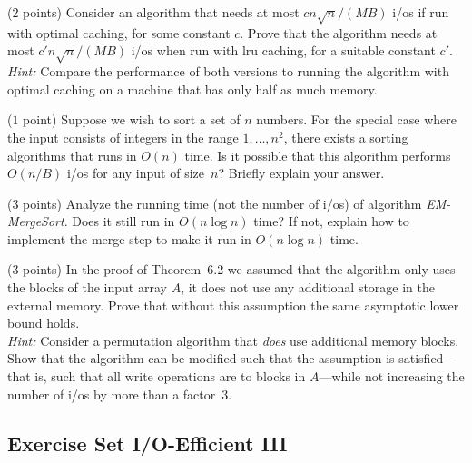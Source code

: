 \documentclass{article}
\newcommand{\io}{{\sc i/o}\xspace}
\newcommand{\ios}{{\io}s\xspace}
\newcommand{\lru}{{\sc lru}\xspace}
\newcounter{rcounter}
\newenvironment{rlist}%
{\begin{list}{\setnr-\arabic{rcounter}}{\usecounter{rcounter}}}{\end{list}}
\begin{document}
    \begin{rlist}
        
        \item (2 points)
        Consider an algorithm that needs at most $c n\sqrt{n} / (MB)$ \ios if run with
        optimal caching, for some constant $c$. Prove that the algorithm needs at most
        $c' n\sqrt{n} / (MB)$ \ios when run with \lru caching, for a suitable constant $c'$.
        \\[2mm]
        \emph{Hint:} Compare the performance of both versions to running the algorithm with optimal
        caching on a machine that has only half as much memory.
        
        \item ($1$ point)
        Suppose we wish to sort a set of $n$ numbers.
        For the special case where the input consists of integers in the range $1,\ldots,n^2$,
        there exists a sorting algorithms that runs in $O(n)$ time.
        Is it possible that this algorithm performs $O(n/B)$ \ios for
        any input of size~$n$? Briefly explain your answer.
        
        
        
        \item (3 points)
        Analyze the running time (not the number of \ios) of algorithm \emph{EM-MergeSort}.
        Does it still run in $O(n\log n)$ time? If not, explain how to implement the
        merge step to make it run in $O(n\log n)$ time.
        
        
        \item(3 points)
        In the proof of Theorem~6.2 we assumed that the algorithm only
        uses the blocks of the input array $A$, it does not use any additional storage
        in the external memory. Prove that without this assumption the same asymptotic lower
        bound holds.
        \\[2mm]
        \emph{Hint:} Consider a permutation algorithm that \emph{does} use additional memory blocks.
        Show that the algorithm can be modified such that the assumption is satisfied---that is,
        such that all write operations are to blocks in $A$---while not increasing the number
        of \ios by more than a factor~3.
    \end{rlist}
    
    
    
    
    \renewcommand{\setnr}{IO.III}
    \subsection*{Exercise Set I/O-Efficient III}
    
\end{document}
